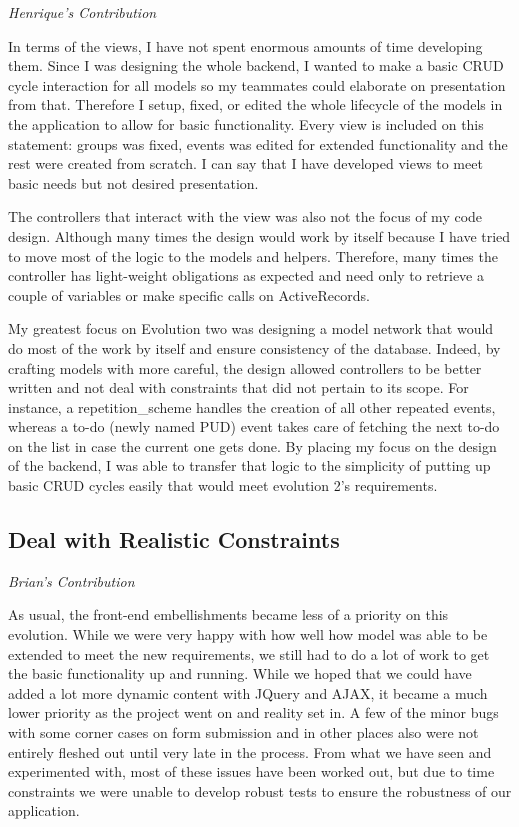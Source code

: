 \documentclass[11pt]{article}
\begin{document}
\textit{Henrique's Contribution}

In terms of the views, I have not spent enormous amounts of time developing them. Since I was designing the whole backend, I wanted to make a basic CRUD cycle interaction for all models so my teammates could elaborate on presentation from that. Therefore I setup, fixed, or edited the whole lifecycle of the models in the application to allow for basic functionality. Every view is included on this statement: groups was fixed, events was edited for extended functionality and the rest were created from scratch. I can say that I have developed views to meet basic needs but not desired presentation.

The controllers that interact with the view was also not the focus of my code design. Although many times the design would work by itself because I have tried to move most of the logic to the models and helpers. Therefore, many times the controller has light-weight obligations as expected and need only to retrieve a couple of variables or make specific calls on ActiveRecords.

My greatest focus on Evolution two was designing a model network that would do most of the work by itself and ensure consistency of the database. Indeed, by crafting models with more careful, the design allowed controllers to be better written and not deal with constraints that did not pertain to its scope. For instance, a repetition_scheme handles the creation of all other repeated events, whereas a to-do (newly named PUD) event takes care of fetching the next to-do on the list in case the current one gets done. By placing my focus on the design of the backend, I was able to transfer that logic to the simplicity of putting up basic CRUD cycles easily that would meet evolution 2’s requirements.

\subsection{Deal with Realistic Constraints}

\textit{Brian's Contribution}

As usual, the front-end embellishments became less of a priority on this evolution. While we were very happy with how well how model was able to be extended to meet the new requirements, we still had to do a lot of work to get the basic functionality up and running. While we hoped that we could have added a lot more dynamic content with JQuery and AJAX, it became a much lower priority as the project went on and reality set in. A few of the minor bugs with some corner cases on form submission and in other places also were not entirely fleshed out until very late in the process. From what we have seen and experimented with, most of these issues have been worked out, but due to time constraints we were unable to develop robust tests to ensure the robustness of our application.
\end{document}

